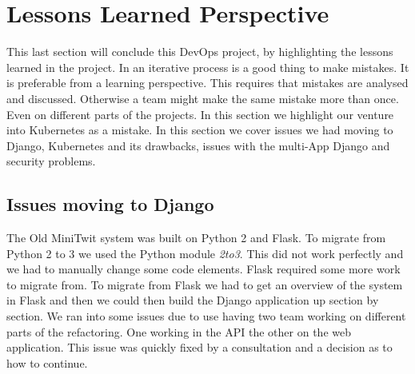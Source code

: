 \documentclass[12pt]{article}
\begin{document}
    
\section{Lessons Learned Perspective}
This last section will conclude this DevOps project, by highlighting the lessons learned in the project. In an iterative process is a good thing to make mistakes. It is preferable from a learning perspective. This requires that mistakes are analysed and discussed. Otherwise a team might make the same mistake more than once. Even on different parts of the projects. In this section we highlight our venture into Kubernetes as a mistake. In this section we cover issues we had moving to Django, Kubernetes and its drawbacks, issues with the multi-App Django and security problems.
\subsection{Issues moving to Django}
The Old MiniTwit system was built on Python 2 and Flask. To migrate from Python 2 to 3 we used the Python module \textit{2to3}. This did not work perfectly and we had to manually change some code elements. Flask required some more work to migrate from. To migrate from Flask we had to get an overview of the system in Flask and then we could then build the Django application up section by section. We ran into some issues due to use having two team working on different parts of the refactoring. One working in the API the other on the web application. This issue was quickly fixed by a consultation and a decision as to how to continue.
\end{document}
